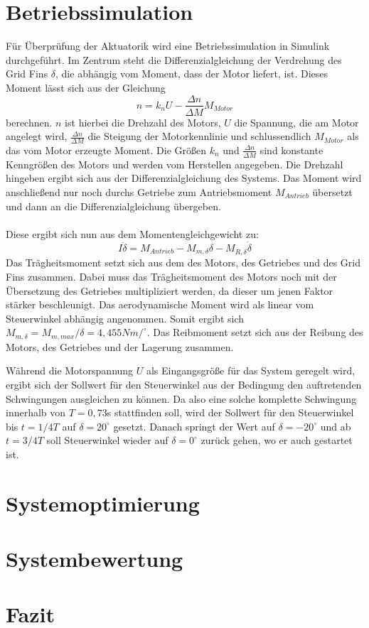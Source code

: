 \section{Betriebssimulation}
Für Überprüfung der Aktuatorik wird eine Betriebssimulation in Simulink durchgeführt.
Im Zentrum steht die Differenzialgleichung der Verdrehung des Grid Fins $\delta$, die abhängig vom Moment, dass der Motor liefert, ist. Dieses Moment lässt sich aus der Gleichung
\begin{equation}
	n =k_nU-\frac{\Delta n}{\Delta M}M_{Motor}
\end{equation}
berechnen. $n$ ist hierbei die Drehzahl des Motors, $U$ die Spannung, die am Motor angelegt wird, $\frac{\Delta n}{\Delta M}$ die Steigung der Motorkennlinie und schlussendlich $M_{Motor}$ als das vom Motor erzeugte Moment. Die Größen $k_n$ und $\frac{\Delta n}{\Delta M}$ sind konstante Kenngrößen des Motors und werden vom Herstellen angegeben. Die Drehzahl hingeben ergibt sich aus der Differenzialgleichung des Systems. Das Moment wird anschließend nur noch durchs Getriebe zum Antriebsmoment $M_{Antrieb}$ übersetzt und dann an die Differenzialgleichung übergeben.
\\~\\
Diese ergibt sich nun aus dem Momentengleichgewicht zu:
\begin{equation}
	I\ddot{\delta} = M_{Antrieb} - M_{m, \delta}\delta - M_{R, \dot{\delta}}\dot{\delta}
\end{equation}
Das Trägheitsmoment setzt sich aus dem des Motors, des Getriebes und des Grid Fins zusammen. Dabei muss das Trägheitsmoment des Motors noch mit der Übersetzung des Getriebes multipliziert werden, da dieser um jenen Faktor stärker beschleunigt. Das aerodynamische Moment wird als linear vom Steuerwinkel abhängig angenommen. Somit ergibt sich $M_{m, \delta} = M_{m, max}/\delta = 4,455Nm/^\circ$. Das Reibmoment setzt sich aus der Reibung des Motors, des Getriebes und der Lagerung zusammen.

Während die Motorspannung $U$ als Eingangsgröße für das System geregelt wird, ergibt sich der Sollwert für den Steuerwinkel aus der Bedingung den auftretenden Schwingungen ausgleichen zu können. Da also eine solche komplette Schwingung innerhalb von $T = 0,73$s stattfinden soll, wird der Sollwert für den Steuerwinkel bis $t = 1/4T$ auf $\delta = 20^\circ$ gesetzt. Danach springt der Wert auf $\delta = -20^\circ$ und ab $t = 3/4T$ soll Steuerwinkel wieder auf $\delta = 0^\circ$ zurück gehen, wo er auch gestartet ist.
\section{Systemoptimierung}

\section{Systembewertung}

\section{Fazit}